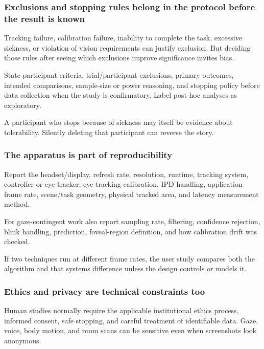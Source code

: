 \subsubsection{Exclusions and stopping rules belong in the protocol before the result is known}\label{04-visual-computing-ii-ch035-exclusions-and-stopping-rules-belong-in-the-protocol-before-the-result-is-known}

Tracking failure, calibration failure, inability to complete the task, excessive sickness, or violation of vision requirements can justify exclusion. But deciding those rules after seeing which exclusions improve significance invites bias.

State participant criteria, trial/participant exclusions, primary outcomes, intended comparisons, sample-size or power reasoning, and stopping policy before data collection when the study is confirmatory. Label post-hoc analyses as exploratory.

A participant who stops because of sickness may itself be evidence about tolerability. Silently deleting that participant can reverse the story.

\subsubsection{The apparatus is part of reproducibility}\label{04-visual-computing-ii-ch035-the-apparatus-is-part-of-reproducibility}

Report the headset/display, refresh rate, resolution, runtime, tracking system, controller or eye tracker, eye-tracking calibration, IPD handling, application frame rate, scene/task geometry, physical tracked area, and latency measurement method.

For gaze-contingent work also report sampling rate, filtering, confidence rejection, blink handling, prediction, foveal-region definition, and how calibration drift was checked.

If two techniques run at different frame rates, the user study compares both the algorithm and that systems difference unless the design controls or models it.

\subsubsection{Ethics and privacy are technical constraints too}\label{04-visual-computing-ii-ch035-ethics-and-privacy-are-technical-constraints-too}

Human studies normally require the applicable institutional ethics process, informed consent, safe stopping, and careful treatment of identifiable data. Gaze, voice, body motion, and room scans can be sensitive even when screenshots look anonymous.

